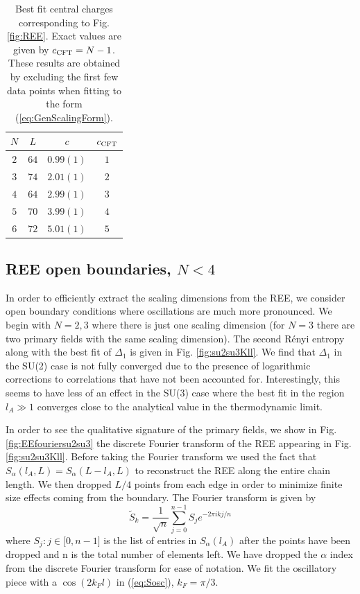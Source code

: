 \documentclass[aps,prb,reprint,floatfix]{revtex4-1}
\begin{document}
\begin{table}
\begin{tabular}{cccc} \hline
$N$ & $L$ & $c$ & $c_{\rm CFT}$ \\%
\hline
$2$ & $64$ & $0.99(1)$ & $1$   \\%
$3$ & $74$ & $2.01(1)$ & $2$   \\%
$4$ & $64$ & $2.99(1)$ & $3$   \\%
$5$ & $70$ & $3.99(1)$ & $4$   \\%
$6$ & $72$ & $5.01(1)$ & $5$   \\%
\hline
\end{tabular}
\caption{Best fit central charges corresponding to Fig. \ref{fig:REE}.  Exact values are given by $c_{\rm CFT}=N-1$.  These results are obtained by excluding the first few data points when fitting to the form (\ref{eq:GenScalingForm}).}
\label{tab:central}
\end{table} 

\subsection{REE open boundaries, $N<4$} 
\label{subsec:REEopenBCNls4}

In order to efficiently extract the scaling dimensions from the REE, we consider open boundary conditions where oscillations are much more pronounced.  We begin with $N=2,3$ where there is just one scaling dimension (for $N=3$ there are two primary fields with the same scaling dimension).  The second R\'{e}nyi entropy along with the best fit of $\Delta_{1}$ is given in Fig. \ref{fig:su2su3Kll}.  We find that $\Delta_{1}$ in the SU(2) case is not fully converged due to the presence of logarithmic corrections to correlations that have not been accounted for.\cite{Affleck1999:LogCorrections}  Interestingly, this seems to have less of an effect in the SU(3) case where the best fit in the region $l_{A}\gg1$ converges close to the analytical value in the thermodynamic limit.  

In order to see the qualitative signature of the primary fields, we show in Fig. \ref{fig:EEfouriersu2su3} the discrete Fourier transform of the REE appearing in Fig. \ref{fig:su2su3Kll}.  Before taking the Fourier transform we used the fact that $S_{\alpha}(l_{A},L)=S_{\alpha}(L-l_{A},L)$ to reconstruct the REE along the entire chain length.  We then dropped $L/4$ points from each edge in order to minimize finite size effects coming from the boundary.  The Fourier transform is given by
{\allowdisplaybreaks
\begin{equation}
		\tilde{S}_{k} =\frac{1}{\sqrt{n}}\sum_{j=0}^{n-1}S_{j}e^{-2\pi i k j /n}
\label{eq:EEfourier}
\end{equation}}
where $S_{j}:j\in\lbrack0,n-1\rbrack$ is the list of entries in $S_{\alpha}(l_{A})$ after the points have been dropped and n is the total number of elements left.  We have dropped the $\alpha$ index from the discrete Fourier transform for ease of notation. We fit the oscillatory piece with a $\cos(2k_Fl)$ in (\ref{eq:Sosc}), $k_F=\pi/3$. 
\end{document}

